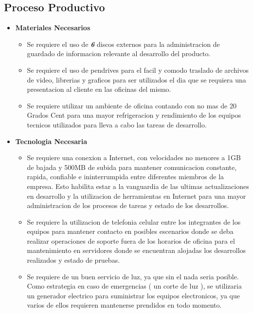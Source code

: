 \documentclass[
10pt, %
a4paper, %
oneside, %
headinclude,footinclude, %
BCOR5mm, %
]{scrartcl}
\begin{document}
\subsection{Proceso Productivo}
\begin{itemize}
  \item \textbf {Materiales Necesarios}
  \begin{itemize}
    \item Se requiere el uso de \emph { \textbf{6} } discos externos para la
            administracion de guardado de informacion relevante al desarrollo
            del producto.
    \item Se requiere el uso de pendrives para el facil
            y comodo traslado de archivos de video, librerias y graficos
            para ser utilizados el dia que se requiera una presentacion al
            cliente en las oficinas del mismo.
    \item Se requiere utilizar un ambiente de oficina  contando con no mas
            de 20 Grados Cent para una mayor refrigeracion y rendimiento de los
            equipos tecnicos utilizados para lleva a cabo las tareas de desarrollo.
  \end{itemize}

  \item \textbf {Tecnologia Necesaria}
  \begin{itemize}
    \item Se requiere una conexion a Internet, con velocidades no menores a
            1GB de bajada y 500MB de subida para mantener comunicacion
            constante, rapida, confiable e ininterrumpida entre diferentes
            miembros de la empresa. Esto habilita estar a la vanguardia de las
            ultimas actualizaciones en desarrollo y la utilizacion de
            herramientas en Internet para una mayor administracion de los
            procesos de tareas y estado de los desarrollos.
    \item Se requiere la utilizacion de telefonia celular entre los integrantes
            de los equipos para mantener contacto en posibles escenarios donde
            se deba realizar operaciones de soporte fuera de los horarios de
            oficina para el mantenimiento en servidores donde se encuentran
            alojadas los desarrollos realizados y estado de pruebas.

    \item Se requiere de un buen servicio de luz, ya que sin el nada seria
            posible. Como estrategia en caso de emergencias ( un corte de luz ),
            se utilizaria un generador electrico para suministrar los
            equipos electronicos, ya que varios de ellos requieren mantenerse
            prendidos en todo momento.
  \end{itemize}


\end{itemize}
\end{document}

